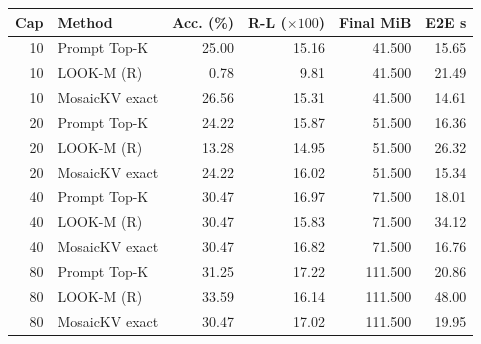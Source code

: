 \begin{tabular}{rlrrrr}
\toprule
Cap & Method & Acc. (\%) & R-L ($\times100$) & Final MiB & E2E s\\\midrule
10 & Prompt Top-K & 25.00 & 15.16 & 41.500 & 15.65\\
10 & LOOK-M (R) & 0.78 & 9.81 & 41.500 & 21.49\\
10 & MosaicKV exact & 26.56 & 15.31 & 41.500 & 14.61\\
20 & Prompt Top-K & 24.22 & 15.87 & 51.500 & 16.36\\
20 & LOOK-M (R) & 13.28 & 14.95 & 51.500 & 26.32\\
20 & MosaicKV exact & 24.22 & 16.02 & 51.500 & 15.34\\
40 & Prompt Top-K & 30.47 & 16.97 & 71.500 & 18.01\\
40 & LOOK-M (R) & 30.47 & 15.83 & 71.500 & 34.12\\
40 & MosaicKV exact & 30.47 & 16.82 & 71.500 & 16.76\\
80 & Prompt Top-K & 31.25 & 17.22 & 111.500 & 20.86\\
80 & LOOK-M (R) & 33.59 & 16.14 & 111.500 & 48.00\\
80 & MosaicKV exact & 30.47 & 17.02 & 111.500 & 19.95\\
\bottomrule
\end{tabular}
